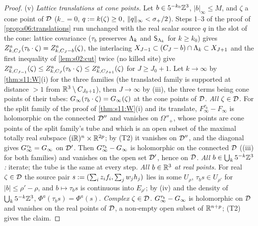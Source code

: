 \begin{proof}
(v) \emph{Lattice translations at cone points.} Let $b\in5^{-k_0}\mathbb Z^3$, $|b|_\infty\le M$, and $\zeta$ a cone point of $\mathcal D$ ($k_-=0$, $q:= k(\zeta)\ge0$, $\lVert q\rVert_\infty<\sigma_+/2$). Steps 1--3 of the proof of \cref{prop:s06:translations} run unchanged with the real scalar source $q$ in the slot of the cone: lattice covariance ($\tau_b$ preserves $\Lambda_k$ and $\mathsf S_{\Lambda_k}$ for $k\ge k_0$) gives $Z^a_{k,C_J}(\tau_b\cdot\zeta)=Z^a_{k,C_J-b}(\zeta)$, the interlacing $X_{J-1}\subset(C_J-b)\cap\Lambda_k\subset X_{J+1}$ and the first inequality of \cref{lem:s02:cut} twice (no killed site) give $Z^a_{k,C_{J-1}}(\zeta)\le Z^a_{k,C_J}(\tau_b\cdot\zeta)\le Z^a_{k,C_{J+1}}(\zeta)$ for $J\ge J_0+1$. Let $k\to\infty$ by \cref{thm:s11:W}(i) for the three families (the translated family is supported at distance $>1$ from $\mathbb R^3\setminus C_{J_0+1}$), then $J\to\infty$ by (iii), the three terms being cone points of their tubes: $G_\infty(\tau_b\cdot\zeta)=G_\infty(\zeta)$ at the cone points of $\mathcal D$. \emph{All $\zeta\in\mathcal D$.} For the split family of the proof of \cref{thm:s11:W}(i) and its translate, $F^{\tau_b}_\infty-F_\infty$ is holomorphic on the connected $\mathcal D''$ and vanishes on $\Omega''_+$, whose points are cone points of the split family's tube and which is an open subset of the maximal totally real subspace $(\mathrm i\mathbb R)^n\times\mathbb R^{2p}$; by (T2) it vanishes on $\mathcal D''$, and the diagonal gives $G^{\tau_b}_\infty=G_\infty$ on $\mathcal D'$. Then $G^{\tau_b}_\infty-G_\infty$ is holomorphic on the connected $\mathcal D$ ((iii) for both families) and vanishes on the open set $\mathcal D'$, hence on $\mathcal D$. \emph{All $b\in\bigcup_k5^{-k}\mathbb Z^3$:} iterate; the tube is the same at every step. \emph{All $b\in\mathbb R^3$ at real points.} For real $\zeta\in\mathcal D$ the source pair $s:=(\sum_iz_if_i,\sum_jw_jh_j)$ lies in some $U_\rho$, $\tau_bs\in U_{\rho'}$ for $|b|\le\rho'-\rho$, and $b\mapsto\tau_bs$ is continuous into $E_{\rho'}$; by (iv) and the density of $\bigcup_k5^{-k}\mathbb Z^3$, $\Phi^a(\tau_bs)=\Phi^a(s)$. \emph{Complex $\zeta\in\mathcal D$.} $G^{\tau_b}_\infty-G_\infty$ is holomorphic on $\mathcal D$ and vanishes on the real points of $\mathcal D$, a non-empty open subset of $\mathbb R^{n+p}$; (T2) gives the claim.
\end{proof}

